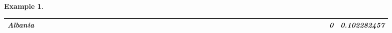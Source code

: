 \documentclass[a4paper,11pt]{report}
\newtheorem{example}[theorem]{Example}
\begin{document}
\begin{example}
\begin{appendices}
\begin{landscape}
\begin{longtable}{r|r|r|r|r|r|r|r|r|r|r|r|r|r|r|r|r|r|r|r|r|r|r|r|r|r|r|r|r|r|r|r|r|r|r|r|r|r|r|r|r|r|r|r|}
\multicolumn{1}{|r|}{\textbf{Albania}}         &                                       &                                       &                                       &                                          &                                       &                                       &                                        &                                       &                                      &                                       &                                       &                                                &                                       &                                      &                                       &                                       &                                      &                                       &                                       &                                       &                                      &                                     &                                      &                                         &                                     &                                       &                                          &                                      &                                       &                                      &                                          &                                      &                                        &                                     &                                      &                                           &                                               &                                       &                                              &                                      &                                     & 0                                             & 0.102282457                             \\ \hline

\end{longtable}
\end{landscape}
\end{appendices}
\end{example}
\end{document}
